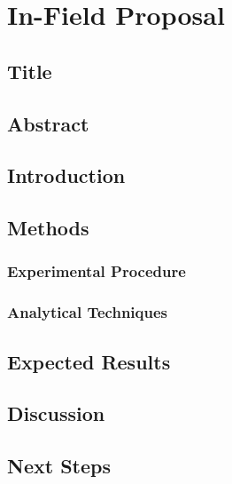 \documentclass[12pt]{article}
\begin{document}
\newpage 
\section{In-Field Proposal}
\subsection*{Title}

\begin{doublespacing}
\subsection{Abstract}



\subsection{Introduction}





        

\subsection{Methods}
\subsubsection*{Experimental Procedure}

\subsubsection*{Analytical Techniques}

\subsection{Expected Results}

\subsection{Discussion}


\subsection{Next Steps}


\end{doublespacing}
\end{document}
